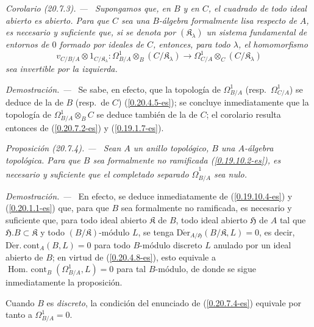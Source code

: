 \documentclass[10pt,oneside]{book}
\makeatletter
\newcommand{\sref}[1]{\textup{(\ref{#1})}}
\newcommand{\setmanualcurrentlabel}[1]{\def\@currentlabel{#1}}
\newenvironment{proposition}[1][]{%
  \setmanualcurrentlabel{#1}\par\medskip\noindent\itshape Proposición (#1). ---\ }{\par}
\newenvironment{corollary}[1][]{%
  \setmanualcurrentlabel{#1}\par\medskip\noindent\itshape Corolario (#1). ---\ }{\par}
\newenvironment{proof}{%
  \par\medskip\noindent\textit{Demostración. ---\ }}{\par}
\makeatother
\begin{document}
\begin{corollary}[20.7.3]
\label{0.20.7.3-es}
Supongamos que, en $B$ y en $C$, el cuadrado de todo ideal abierto es abierto.
Para que $C$ sea una $B$-álgebra formalmente lisa respecto de $A$, es
necesario y suficiente que, si se denota por $(\mathfrak K_\lambda)$ un sistema
fundamental de entornos de $0$ formado por ideales de $C$, entonces, para todo
$\lambda$, el homomorfismo
\begin{equation}
\tag{20.7.3.1}
\label{0.20.7.3.1-es}
  v_{C/B/A}\otimes 1_{C/\mathfrak K_\lambda}:
  \Omega^1_{B/A}\otimes_B(C/\mathfrak K_\lambda)\to
  \Omega^1_{C/A}\otimes_C(C/\mathfrak K_\lambda)
\end{equation}
sea invertible por la izquierda.
\end{corollary}

\begin{proof}
Se sabe, en efecto, que la topología de $\Omega^1_{B/A}$ (resp.\
$\Omega^1_{C/A}$) se deduce de la de $B$ (resp.\ de $C$)
\sref{0.20.4.5-es}; se concluye inmediatamente que la topología de
$\Omega^1_{B/A}\otimes_B C$ se deduce también de la de $C$; el corolario
resulta entonces de \sref{0.20.7.2-es} y \sref{0.19.1.7-es}.
\end{proof}

\begin{proposition}[20.7.4]
\label{0.20.7.4-es}
Sean $A$ un anillo topológico, $B$ una $A$-álgebra topológica. Para que
$B$ sea formalmente no ramificada \textup{\sref{0.19.10.2-es}}, es necesario y suficiente
que el completado separado $\widehat{\Omega}^1_{B/A}$ sea nulo.
\end{proposition}

\begin{proof}
En efecto, se deduce inmediatamente de \sref{0.19.10.4-es} y
\sref{0.20.1.1-es} que, para que $B$ sea formalmente no ramificada, es necesario y
suficiente que, para todo ideal abierto $\mathfrak K$ de $B$, todo ideal abierto
$\mathfrak{H}$ de $A$ tal que $\mathfrak H.B\subset\mathfrak K$ y todo
$(B/\mathfrak K)$-módulo $L$, se tenga
$\operatorname{D\acute{e}r}_{A/\mathfrak{H}}(B/\mathfrak K,L)=0$,
es decir, $\operatorname{D\acute{e}r.\ cont}_A(B,L)=0$ para todo
$B$-módulo discreto $L$ anulado por un ideal abierto de $B$; en virtud de
\sref{0.20.4.8-es}, esto equivale a
$\operatorname{Hom.\ cont}_B(\Omega^1_{B/A},L)=0$ para tal $B$-módulo,
de donde se sigue inmediatamente la proposición.

Cuando $B$ es \emph{discreto}, la condición del enunciado de
\sref{0.20.7.4-es} equivale por tanto a $\Omega^1_{B/A}=0$.
\end{proof}
\end{document}

